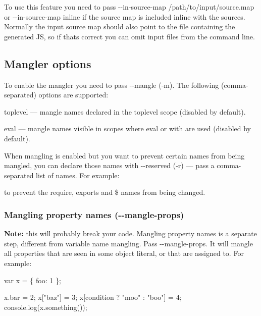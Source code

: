 To use this feature you need to pass {\ttfamily -\/-\/in-\/source-\/map /path/to/input/source.map} or {\ttfamily -\/-\/in-\/source-\/map inline} if the source map is included inline with the sources. Normally the input source map should also point to the file containing the generated JS, so if that\textquotesingle{}s correct you can omit input files from the command line.

\subsection*{Mangler options}

To enable the mangler you need to pass {\ttfamily -\/-\/mangle} ({\ttfamily -\/m}). The following (comma-\/separated) options are supported\+:


\begin{DoxyItemize}
\item {\ttfamily toplevel} — mangle names declared in the toplevel scope (disabled by default).
\item {\ttfamily eval} — mangle names visible in scopes where {\ttfamily eval} or {\ttfamily with} are used (disabled by default).
\end{DoxyItemize}

When mangling is enabled but you want to prevent certain names from being mangled, you can declare those names with {\ttfamily -\/-\/reserved} ({\ttfamily -\/r}) — pass a comma-\/separated list of names. For example\+: 


to prevent the {\ttfamily require}, {\ttfamily exports} and {\ttfamily \$} names from being changed.

\subsubsection*{Mangling property names ({\ttfamily -\/-\/mangle-\/props})}

{\bfseries Note\+:} this will probably break your code. Mangling property names is a separate step, different from variable name mangling. Pass {\ttfamily -\/-\/mangle-\/props}. It will mangle all properties that are seen in some object literal, or that are assigned to. For example\+:


\begin{DoxyCode}
var x = \{
  foo: 1
\};

x.bar = 2;
x["baz"] = 3;
x[condition ? "moo" : "boo"] = 4;
console.log(x.something());
\end{DoxyCode}


